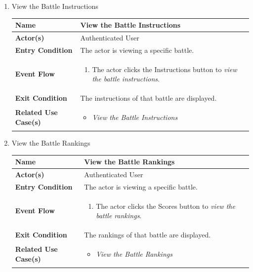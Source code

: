 \begin{enumerate}
\newpage


\item View the Battle Instructions
\begin{center}
    \begin{tabular}{ | m{10em} | m{10cm}| } 
      \hline
      \textbf{Name} & View the Battle Instructions \\ 
      \hline
      \textbf{Actor(s)} & Authenticated User \\ 
      \hline
      \textbf{Entry Condition} & The actor is viewing a specific battle. \\ 
      \hline
      \textbf{Event Flow} & 
          \begin{enumerate}[(1)]
              \item The actor clicks the Instructions button to \textit{view the battle instructions}.
          \end{enumerate}
      \\ 
      \hline
      \textbf{Exit Condition} & The instructions of that battle are displayed.  \\ 
      \hline
      \textbf{Related Use Case(s)} & 
      \begin{itemize}
          \item \textit{View the Battle Instructions}
      \end{itemize}
          \\ 
      \hline
    \end{tabular}
    \label{tbl:uc6}
\end{center}

\item View the Battle Rankings
\begin{center}
    \begin{tabular}{ | m{10em} | m{10cm}| } 
      \hline
      \textbf{Name} & View the Battle Rankings \\ 
      \hline
      \textbf{Actor(s)} & Authenticated User \\ 
      \hline
      \textbf{Entry Condition} & The actor is viewing a specific battle. \\ 
      \hline
      \textbf{Event Flow} & 
          \begin{enumerate}[(1)]
              \item The actor clicks the Scores button to \textit{view the battle rankings}.
          \end{enumerate}
      \\ 
      \hline
      \textbf{Exit Condition} & The rankings of that battle are displayed.  \\ 
      \hline
      \textbf{Related Use Case(s)} & 
      \begin{itemize}
\item \textit{View the Battle Rankings}
      \end{itemize}
          \\ 
      \hline
    \end{tabular}
    \label{tbl:uc7}
\end{center}


\end{enumerate}
